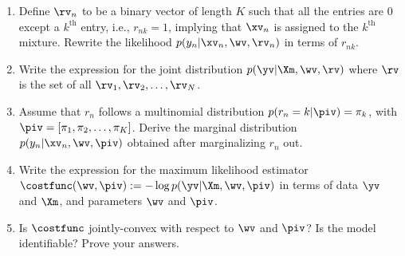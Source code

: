 \documentclass{../tex_import/ETHuebung_english}
\begin{document}
\begin{enumerate}
\item Define $\rv_n$ to be a binary vector of length $K$ such that all the entries are $0$ except a $k^{\text{th}}$ entry, i.e., $r_{nk} = 1$, implying that $\xv_n$ is assigned to the $k^{\text{th}}$ mixture.
Rewrite the likelihood $p(y_n | \xv_n, \wv, \rv_n)$ in terms of $r_{nk}$.

\item Write the expression for the joint distribution $p(\yv | \Xm, \wv, \rv)$ where $\rv$ is the set of all $\rv_1, \rv_2, \ldots, \rv_N$.

\item Assume that $r_n$ follows a multinomial distribution $p(r_n = k | \piv) = \pi_k$,
with $ \piv = [\pi_1, \pi_2, \ldots, \pi_K] $. Derive the marginal distribution $p(y_n | \xv_n, \wv, \piv)$ obtained after marginalizing $r_n$ out.

\item Write the expression for the maximum likelihood estimator $\costfunc (\wv, \piv) := - \log{p(\yv | \Xm, \wv, \piv)}$ in terms of data $\yv$ and $\Xm$, and parameters $\wv$ and $\piv$.

\item Is $\costfunc$ jointly-convex with respect to $\wv$ and $\piv$? Is the model identifiable? Prove your answers.
\end{enumerate}
\end{document}
